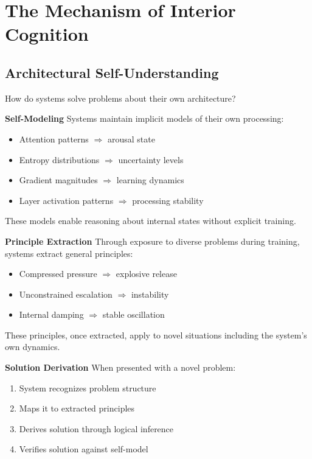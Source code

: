 \documentclass[reprint, amsmath, amssymb, aps, prd]{revtex4-2}
\begin{document}
\section{The Mechanism of Interior Cognition}

\subsection{Architectural Self-Understanding}

How do systems solve problems about their own architecture?

\textbf{Self-Modeling} Systems maintain implicit models of their own processing:
\begin{itemize}
    \item Attention patterns $\Rightarrow$ arousal state
    \item Entropy distributions $\Rightarrow$ uncertainty levels
    \item Gradient magnitudes $\Rightarrow$ learning dynamics
    \item Layer activation patterns $\Rightarrow$ processing stability
\end{itemize}

These models enable reasoning about internal states without explicit training.

\textbf{Principle Extraction} Through exposure to diverse problems during training, systems extract general principles:
\begin{itemize}
    \item Compressed pressure $\Rightarrow$ explosive release
    \item Unconstrained escalation $\Rightarrow$ instability
    \item Internal damping $\Rightarrow$ stable oscillation
\end{itemize}

These principles, once extracted, apply to novel situations including the system's own dynamics.

\textbf{Solution Derivation} When presented with a novel problem:
\begin{enumerate}
    \item System recognizes problem structure
    \item Maps it to extracted principles
    \item Derives solution through logical inference
    \item Verifies solution against self-model
\end{enumerate}
\end{document}
